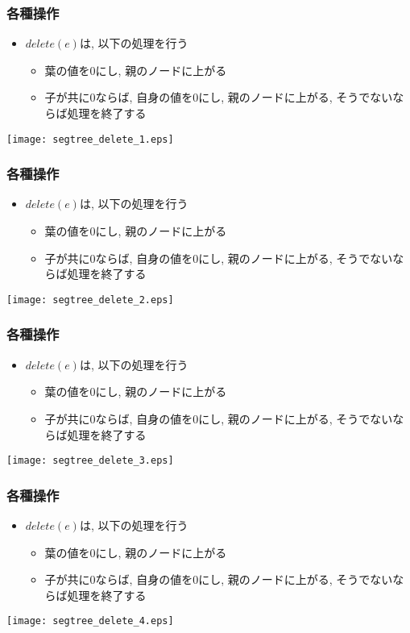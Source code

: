 \documentclass[dvipdfmx,12pt,notheorems]{beamer}
\theoremstyle{definition}
\begin{document}
\begin{frame}\frametitle{各種操作}
\begin{itemize}
\item $delete(e)$は, 以下の処理を行う
\begin{itemize}
\item 葉の値を$0$にし, 親のノードに上がる
\item 子が共に$0$ならば, 自身の値を$0$にし, 親のノードに上がる, そうでないならば処理を終了する
\end{itemize}
\end{itemize}
\texttt{[image: segtree\_delete\_1.eps]}
\end{frame}

\begin{frame}\frametitle{各種操作}
\begin{itemize}
\item $delete(e)$は, 以下の処理を行う
\begin{itemize}
\item 葉の値を$0$にし, 親のノードに上がる
\item 子が共に$0$ならば, 自身の値を$0$にし, 親のノードに上がる, そうでないならば処理を終了する
\end{itemize}
\end{itemize}
\texttt{[image: segtree\_delete\_2.eps]}
\end{frame}

\begin{frame}\frametitle{各種操作}
\begin{itemize}
\item $delete(e)$は, 以下の処理を行う
\begin{itemize}
\item 葉の値を$0$にし, 親のノードに上がる
\item 子が共に$0$ならば, 自身の値を$0$にし, 親のノードに上がる, そうでないならば処理を終了する
\end{itemize}
\end{itemize}
\texttt{[image: segtree\_delete\_3.eps]}
\end{frame}

\begin{frame}\frametitle{各種操作}
\begin{itemize}
\item $delete(e)$は, 以下の処理を行う
\begin{itemize}
\item 葉の値を$0$にし, 親のノードに上がる
\item 子が共に$0$ならば, 自身の値を$0$にし, 親のノードに上がる, そうでないならば処理を終了する
\end{itemize}
\end{itemize}
\texttt{[image: segtree\_delete\_4.eps]}
\end{frame}
\end{document}
